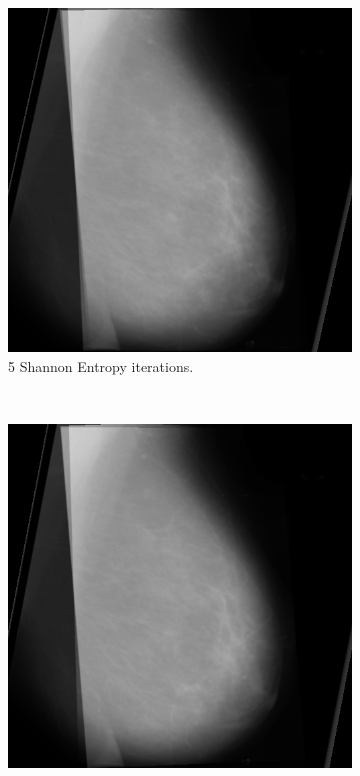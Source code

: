 \begin{figure}[H]
    \centering
    \begin{subfigure}[t]{0.3\textwidth}
        \includegraphics[width=\textwidth]{Chapter3/shannon-img/s-5-final.png}
        \caption{5 Shannon Entropy iterations.}
        \label{fig:5-shannon}
    \end{subfigure} \hfill
    ~ %
    \begin{subfigure}[t]{0.3\textwidth}
        \includegraphics[width=\textwidth]{Chapter3/shannon-img/s-10-final.png}

\end{subfigure}
\end{figure}
